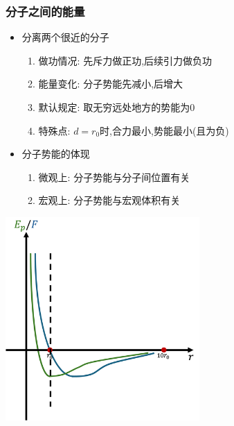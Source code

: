 \documentclass{article}
\begin{document}
\subsubsection{分子之间的能量}
\begin{itemize}
    \item 分离两个很近的分子
          \begin{enumerate}[label = (\arabic*)]
              \item 做功情况: 先斥力做正功,后续引力做负功
              \item 能量变化: 分子势能先减小,后增大
              \item 默认规定: 取无穷远处地方的势能为$0$
              \item 特殊点: $d = r_{0}$时,合力最小,势能最小(且为负)
          \end{enumerate}
    \item 分子势能的体现
          \begin{enumerate}[label = (\arabic*)]
              \item 微观上: 分子势能与分子间位置有关
              \item 宏观上: 分子势能与宏观体积有关
          \end{enumerate}
\end{itemize}

\includegraphics[width = 20em]{./pictures/26.png}

\vspace{2em}
\end{document}

